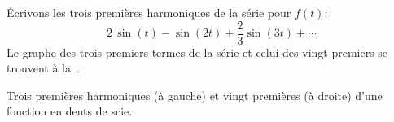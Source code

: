 \begin{example}
Écrivons les trois premières harmoniques de la série pour $f(t)$: 
\begin{equation*}
2 \, \sin (t)
- \sin (2t)
+\frac{2}{3} \sin (3t)
+ \cdots
\end{equation*}
Le graphe des trois premiers termes de la série et celui des vingt premiers se trouvent à la~.

\begin{myfig}
\capstart
\caption{Trois premières harmoniques (à gauche) et vingt premières (à droite) d'une fonction en dents de scie.\label{ts:sawtoothfsfig}}
\end{myfig}
\end{example}

